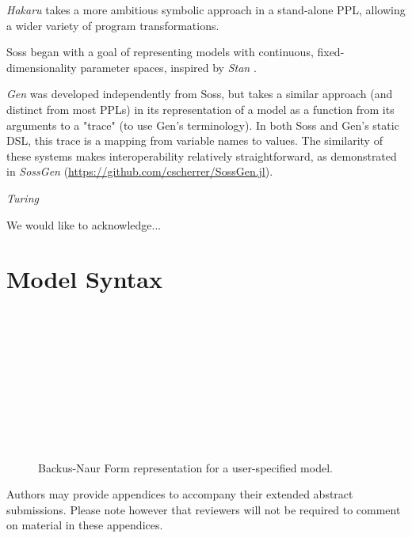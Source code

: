 \documentclass[anonymous=false, %
               format=acmsmall, %
               review=true, %
               screen=true, %
               nonacm=true]{acmart}
\begin{document}
\emph{Hakaru} \cite{narayanan2016probabilistic} takes a more ambitious symbolic approach in a stand-alone PPL, allowing a wider variety of program transformations. 

Soss began with a goal of representing models with continuous, fixed-dimensionality parameter spaces, inspired by \emph{Stan} \cite{stan:2017}.

\emph{Gen} \cite{Cusumano-Towner:2019} was developed independently from Soss, but takes a similar approach (and distinct from most PPLs) in its representation of a model as a function from its arguments to a "trace" (to use Gen's terminology). In both Soss and Gen's static DSL, this trace is a mapping from variable names to values. The similarity of these systems makes interoperability relatively straightforward, as demonstrated in \emph{SossGen} (\url{https://github.com/cscherrer/SossGen.jl}).

\emph{Turing} \cite{ge2018t}

\begin{acks}
We would like to acknowledge...
\end{acks}




\appendix

\section{Model Syntax}

\begin{figure}[!t]
  \centering
\begin{bnf*}
  \\
   \\
   \\ 
   \\
   \\
   \bnfsp {} \\
   \\
   \\ 
   \\
\end{bnf*}
  \caption{Backus-Naur Form representation for a user-specified model.}
  \label{fig:bnf}
\end{figure}


Authors may provide appendices to accompany their extended abstract submissions. Please note however that reviewers will not be required to comment on material in these appendices.
\end{document}
